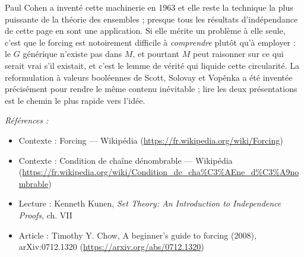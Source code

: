 \documentclass[11pt]{article}
\newenvironment{refs}{\par\small\noindent\emph{Références :}\begin{itemize}\setlength\itemsep{0pt}}{\end{itemize}\normalsize}
\begin{document}
\noindent Paul Cohen a inventé cette machinerie en 1963 et elle reste la technique la plus
puissante de la théorie des ensembles ; presque tous les résultats d'indépendance de cette page en
sont une application. Si elle mérite un problème à elle seule, c'est que le forcing est
notoirement difficile à \textit{comprendre} plutôt qu'à employer : le $ G $ générique n'existe pas
dans $ M $, et pourtant $ M $ peut raisonner sur ce qui serait vrai s'il existait, et c'est le
lemme de vérité qui liquide cette circularité. La reformulation à valeurs booléennes de Scott,
Solovay et Vop\v{e}nka a été inventée précisément pour rendre le même contenu inévitable ; lire les
deux présentations est le chemin le plus rapide vers l'idée.

\begin{refs}
\item Contexte : Forcing --- Wikipédia (\url{https://fr.wikipedia.org/wiki/Forcing})
\item Contexte : Condition de chaîne dénombrable --- Wikipédia (\url{https://fr.wikipedia.org/wiki/Condition_de_cha%C3%AEne_d%C3%A9nombrable})
\item Lecture : Kenneth Kunen, \textit{Set Theory: An Introduction to Independence Proofs}, ch. VII
\item Article : Timothy Y. Chow, \og{} A beginner's guide to forcing \fg{} (2008), arXiv:0712.1320 (\url{https://arxiv.org/abs/0712.1320})
\end{refs}

\bigskip
\end{document}

